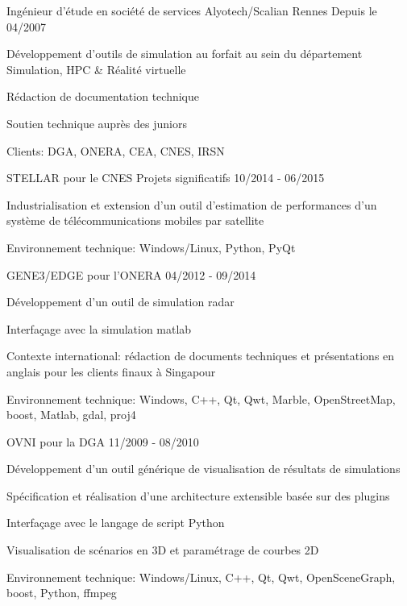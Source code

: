 \begin{cventries}
  \cventry
    {Ingénieur d'étude en société de services}
    {Alyotech/Scalian}
    {Rennes}
    {Depuis le 04/2007}
    {
      \begin{cvitems}
        \item {Développement d'outils de simulation au forfait au sein du département Simulation, HPC \& Réalité virtuelle }
        \item {Rédaction de documentation technique}
        \item {Soutien technique auprès des juniors}
        \item {Clients: DGA, ONERA, CEA, CNES, IRSN}
      \end{cvitems}
    }

  \cventry
    {STELLAR pour le CNES}
    {Projets significatifs}
    {}
    {10/2014 - 06/2015}
    {
      \begin{cvitems}
        \item {Industrialisation et extension d’un outil d’estimation de performances d’un 
			   système de télécommunications mobiles par satellite}
        \item {Environnement technique: Windows/Linux, Python, PyQt}
      \end{cvitems}
    }

  \cventry
    {GENE3/EDGE pour l'ONERA}
    {}
    {}
    {04/2012 - 09/2014}
    {
      \begin{cvitems}
        \item {Développement d’un outil de simulation radar}
        \item {Interfaçage avec la simulation matlab}
		\item {Contexte international: rédaction de documents techniques et 
	  		   présentations en anglais pour les clients finaux à Singapour}
		\item {Environnement technique: Windows, C++, Qt, Qwt, Marble, OpenStreetMap, 
	  		   boost, Matlab, gdal, proj4}
      \end{cvitems}
    }

  \cventry
    {OVNI pour la DGA}
    {}
    {}
    {11/2009 - 08/2010}
    {
      \begin{cvitems}
        \item {Développement d'un outil générique de visualisation de résultats de simulations}
        \item {Spécification et réalisation d'une architecture extensible basée sur des plugins}
        \item {Interfaçage avec le langage de script Python}
        \item {Visualisation de scénarios en 3D et paramétrage de courbes 2D}
		\item {Environnement technique: Windows/Linux, C++, Qt, Qwt, OpenSceneGraph, 
			boost, Python, ffmpeg}
      \end{cvitems}
    }


\end{cventries}
